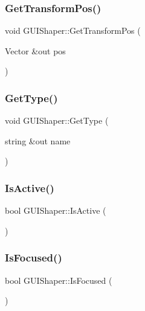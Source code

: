 \subsubsection{\texorpdfstring{Get\+Transform\+Pos()}{GetTransformPos()}}
{\footnotesize\ttfamily void G\+U\+I\+Shaper\+::\+Get\+Transform\+Pos (\begin{DoxyParamCaption}\item[{Vector \&out}]{pos }\end{DoxyParamCaption})}

\hypertarget{class_g_u_i_shaper_a6f06b8b7dcbb268b0b622f511ab09173}{}\label{class_g_u_i_shaper_a6f06b8b7dcbb268b0b622f511ab09173} 
\subsubsection{\texorpdfstring{Get\+Type()}{GetType()}}
{\footnotesize\ttfamily void G\+U\+I\+Shaper\+::\+Get\+Type (\begin{DoxyParamCaption}\item[{string \&out}]{name }\end{DoxyParamCaption})}

\hypertarget{class_g_u_i_shaper_ac249fbdfb1b974a75b74dadc4d707a75}{}\label{class_g_u_i_shaper_ac249fbdfb1b974a75b74dadc4d707a75} 
\subsubsection{\texorpdfstring{Is\+Active()}{IsActive()}}
{\footnotesize\ttfamily bool G\+U\+I\+Shaper\+::\+Is\+Active (\begin{DoxyParamCaption}{ }\end{DoxyParamCaption})}

\hypertarget{class_g_u_i_shaper_ae3be95890824376e5286a391edbb6355}{}\label{class_g_u_i_shaper_ae3be95890824376e5286a391edbb6355} 
\subsubsection{\texorpdfstring{Is\+Focused()}{IsFocused()}}
{\footnotesize\ttfamily bool G\+U\+I\+Shaper\+::\+Is\+Focused (\begin{DoxyParamCaption}{ }\end{DoxyParamCaption})}

